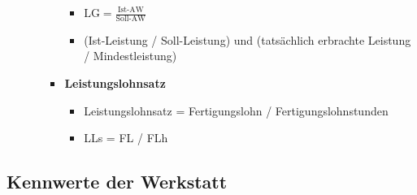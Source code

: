 \begin{enumerate}
\begin{itemize}
\begin{itemize}
      \begin{itemize}
      \item
        $\boxed{\text{LG} = \frac{\text{Ist-AW}}{\text{Soll-AW}}}$
      \item
        (Ist-Leistung / Soll-Leistung) und (tatsächlich erbrachte
        Leistung / Mindestleistung)
      \end{itemize}
    \item
      \textbf{Leistungslohnsatz}

      \begin{itemize}
      \item
        Leistungslohnsatz = Fertigungslohn / Fertigungslohnstunden
      \item
        LLs = FL / FLh
      \end{itemize}
    \end{itemize}
  \end{itemize}
\end{enumerate}

\newpage

\subsection{Kennwerte der Werkstatt}\label{kennwerte-der-werkstatt}

